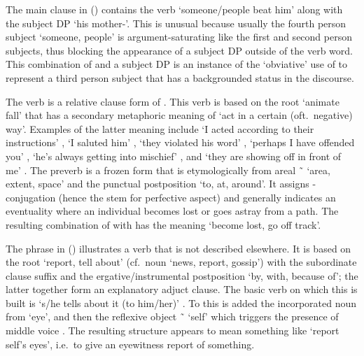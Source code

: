 The main clause in (\lastx) contains the verb  ‘someone/people beat him’ along with the subject DP  ‘his mother-’.
This is unusual because usually the fourth person subject  ‘someone, people’ is argument-saturating like the first and second person subjects, thus blocking the appearance of a subject DP outside of the verb word.
This combination of  and a subject DP is an instance of the ‘obviative’ use of  to represent a third person subject that has a backgrounded status in the discourse.

The verb  is a relative clause form of .
This verb is based on the root  ‘animate fall’ that has a secondary metaphoric meaning of ‘act in a certain (oft.\ negative) way’.
Examples of the latter meaning include  ‘I acted according to their instructions’ \parencite[72.861]{story-naish:1973},  ‘I saluted him’ \parencite[111.1446]{story-naish:1973},  ‘they violated his word’ \parencite[239.3397]{story-naish:1973},  ‘perhaps I have offended you’ \parencite[141.1899]{story-naish:1973},  ‘he’s always getting into mischief’ \parencite[f05/93]{leer:1973}, and  ‘they are showing off in front of me’  \parencite[f05/94]{leer:1973}.
The  preverb is a frozen form that is etymologically from areal  \~\  ‘area, extent, space’ and the punctual postposition  ‘to, at, around’.
It assigns -conjugation (hence the  stem for perfective aspect) and generally indicates an eventuality where an individual becomes lost or goes astray from a path.
The resulting combination of  with  has the meaning ‘become lost, go off track’.

The phrase  in (\lastx) illustrates a verb that is not described elsewhere.
It is based on the root  ‘report, tell about’ (cf.\ noun  ‘news, report, gossip’) with the subordinate clause suffix  and the ergative/instrumental postposition  ‘by, with, because of’; the latter together form an explanatory adjuct clause.
The basic verb on which this is built is  ‘s/he tells about it (to him/her)’ \parencite[282]{leer:1976}.
To this is added the incorporated noun  from  ‘eye’, and then the reflexive object  \~\  ‘self’ which triggers the presence of middle voice .
The resulting structure appears to mean something like ‘report self’s eyes’, i.e.\ to give an eyewitness report of something.

